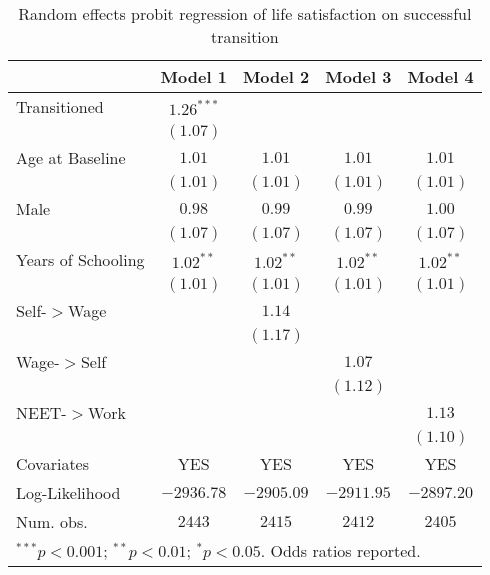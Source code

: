 \begin{table}[H]
\begin{center}
\begin{small}
\caption{Random effects probit regression of life satisfaction on successful transition}
\begin{tabular}{l c c c c}
\toprule
 & Model 1 & Model 2 & Model 3 & Model 4 \\
\midrule
Transitioned    & $1.26^{***}$  &               &               &               \\
               & $(1.07)$      &               &               &               \\
Age at Baseline           & $1.01$        & $1.01$        & $1.01$        & $1.01$        \\
               & $(1.01)$      & $(1.01)$      & $(1.01)$      & $(1.01)$      \\
Male             & $0.98$        & $0.99$        & $0.99$        & $1.00$        \\
               & $(1.07)$      & $(1.07)$      & $(1.07)$      & $(1.07)$      \\
Years of Schooling            & $1.02^{**}$   & $1.02^{**}$   & $1.02^{**}$   & $1.02^{**}$   \\
               & $(1.01)$      & $(1.01)$      & $(1.01)$      & $(1.01)$      \\
Self-$>$Wage       &              & $1.14$       &              &              \\
                   &              & $(1.17)$     &              &              \\
Wage-$>$Self       &              &              & $1.07$       &              \\
                   &              &              & $(1.12)$     &              \\
NEET-$>$Work       &              &              &              & $1.13$       \\
                   &              &              &              & $(1.10)$     \\
\midrule
Covariates         & YES          & YES          & YES          & YES          \\
Log-Likelihood     & $-2936.78$   & $-2905.09$   & $-2911.95$   & $-2897.20$   \\
Num. obs.          & $2443$       & $2415$       & $2412$       & $2405$       \\
\bottomrule
\multicolumn{5}{l}{$^{***}p<0.001$; $^{**}p<0.01$; $^{*}p<0.05$. Odds ratios reported.}
\end{tabular}
\end{small}
\label{tab:reg_table}
\end{center}
\end{table}